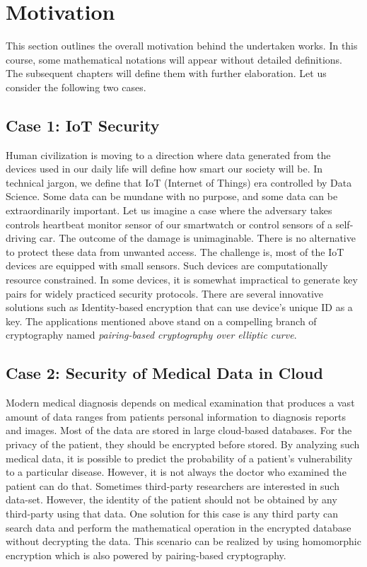 \section{Motivation}
\label{ch1_sec_motivation}

This section outlines the overall motivation behind the undertaken works.
In this course, some mathematical notations will appear without detailed definitions.
The subsequent chapters will define them with further elaboration.
Let us consider the following two cases.

\subsection*{Case 1: IoT Security}
Human civilization is moving to a direction where data generated from the devices used in our daily life will define how smart our society will be.
In technical jargon, we define that IoT (Internet of Things) era controlled by Data Science.
Some data can be mundane with no purpose, and some data can be extraordinarily important.
Let us imagine a case where the adversary takes controls heartbeat monitor sensor of our smartwatch or control sensors of a self-driving car.
The outcome of the damage is unimaginable. 
There is no alternative to protect these data from unwanted access.
The challenge is, most of the IoT devices are equipped with small sensors.
Such devices are computationally resource constrained.
In some devices, it is somewhat impractical to generate key pairs for widely practiced security protocols.
There are several innovative solutions such as Identity-based encryption that can use device's unique ID as a key.
The applications mentioned above stand on a compelling branch of cryptography named \textit{pairing-based cryptography over elliptic curve}.


\subsection*{Case 2: Security of Medical Data in Cloud}
Modern medical diagnosis depends on medical examination that produces a vast amount of data ranges from patients personal information to diagnosis reports and images.
Most of the data are stored in large cloud-based databases. 
For the privacy of the patient, they should be encrypted before stored.
By analyzing such medical data, it is possible to predict the probability of a patient's vulnerability to a particular disease. 
However, it is not always the doctor who examined the patient can do that.
Sometimes third-party researchers are interested in such data-set. 
However, the identity of the patient should not be obtained by any third-party using that data. 
One solution for this case is any third party can search data and perform the mathematical operation in the encrypted database without decrypting the data.
This scenario can be realized by using homomorphic encryption which is also powered by pairing-based cryptography.

